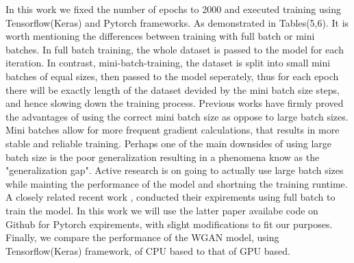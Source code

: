 \documentclass[draft, 10pt]{IEEEtran}
\begin{document}
In this work we fixed the number of epochs to 2000 and executed training using Tensorflow(Keras) and Pytorch frameworks. As demonstrated in Tables(5,6). It is worth mentioning the differences between training with full batch or mini batches. In full batch training, the whole dataset is passed to the model for each iteration. In contrast, mini-batch-training, the dataset is split into small mini batches of equal sizes, then passed to the model seperately, thus for each epoch there will be exactly length  of the dataset devided by the mini batch size steps, and hence slowing down the training process. Previous works \cite{masters2018revisiting, keskar2016large} have firmly proved the advantages of using the correct mini batch size as oppose to large batch sizes. Mini batches allow for more frequent gradient calculations, that results in more stable and reliable training. Perhaps one of the main downsides of using large batch size is the poor generalization resulting in a phenomena know as the "generalization gap". Active research \cite{hoffer2017train} is on going to actually use large batch sizes while mainting the performance of the model and shortning the training runtime. A closely related recent work \cite{paper0}, conducted their expirements using full batch to train the model. In this work we will use the latter paper availabe code on Github for Pytorch expirements, with slight modifications to fit our purposes. Finally, we compare the performance of the WGAN model, using Tensorflow(Keras) framework, of CPU based to that of GPU based.
\end{document}
